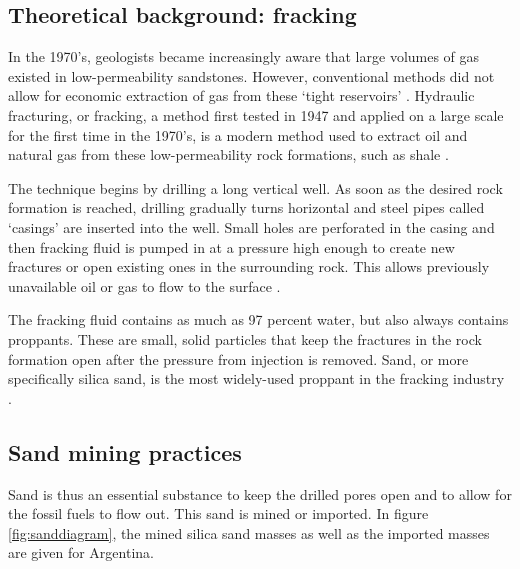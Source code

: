 \subsection{Theoretical background: fracking}
In the 1970's, geologists became increasingly aware that large volumes of gas existed in low-permeability sandstones. However, conventional methods did not allow for economic extraction of gas from these `tight reservoirs' \autocite{lawGasTightReservoirs1992}. Hydraulic fracturing, or fracking, a method first tested in 1947 and applied on a large scale for the first time in the 1970's, is a modern method used to extract oil and natural gas from these low-permeability rock formations, such as shale \autocite{denchakFracking1012019}.

The technique begins by drilling a long vertical well. As soon as the desired rock formation is reached, drilling gradually turns horizontal and steel pipes called `casings' are inserted into the well. Small holes are perforated in the casing and then fracking fluid is pumped in at a pressure high enough to create new fractures or open existing ones in the surrounding rock. This allows previously unavailable oil or gas to flow to the surface \autocite{denchakFracking1012019}.

The fracking fluid contains as much as 97 percent water, but also always contains proppants. These are small, solid particles that keep the fractures in the rock formation open after the pressure from injection is removed. Sand, or more specifically silica sand, is the most widely-used proppant in the fracking industry \autocite{denchakFracking1012019}. 

\subsection{Sand mining practices}
Sand is thus an essential substance to keep the drilled pores open and to allow for the fossil fuels to flow out. This sand is mined or imported. In figure \ref{fig:sanddiagram}, the mined silica sand masses as well as the imported masses are given for Argentina.

